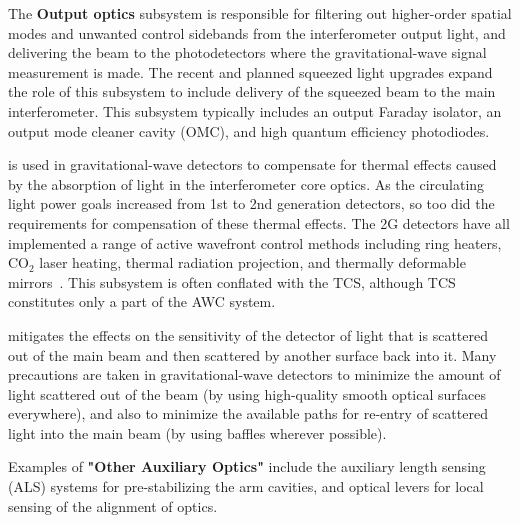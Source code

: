 The {\bf Output optics} subsystem is responsible for filtering out higher-order spatial modes and unwanted control sidebands from the interferometer output light, and delivering the beam to the photodetectors where the gravitational-wave signal measurement is made. The recent and planned squeezed light upgrades expand the role of this subsystem to include delivery of the squeezed beam to the main interferometer. This subsystem typically includes an output Faraday isolator, an output mode cleaner cavity (OMC), and high quantum efficiency photodiodes.

 is used in gravitational-wave detectors to compensate for thermal effects caused by the absorption of light in the interferometer core optics. As the circulating light power goals increased from 1st to 2nd generation detectors, so too did the requirements for compensation of these thermal effects. The \ac{2G}  detectors have all implemented a range of active wavefront control methods including ring heaters, CO$_2$ laser heating, thermal radiation projection, and thermally deformable mirrors~\cite{aLIGO_AWC, AdVirgo_IO}. This subsystem is often conflated with the \ac{TCS}, although \ac{TCS} constitutes only a part of the \ac{AWC} system. 

mitigates the effects on the sensitivity of the detector of light that is scattered out of the main beam and then scattered by another surface back into it. 
Many precautions are taken in gravitational-wave detectors to minimize the amount of light scattered out of the beam (by using high-quality smooth optical surfaces everywhere), and also to minimize the available paths for re-entry of scattered light into the main beam (by using baffles wherever possible). 

\noindent 
Examples of {\bf "Other Auxiliary Optics"} include the auxiliary length sensing (ALS) systems for pre-stabilizing the arm cavities, and optical levers for local sensing of the alignment of optics.

